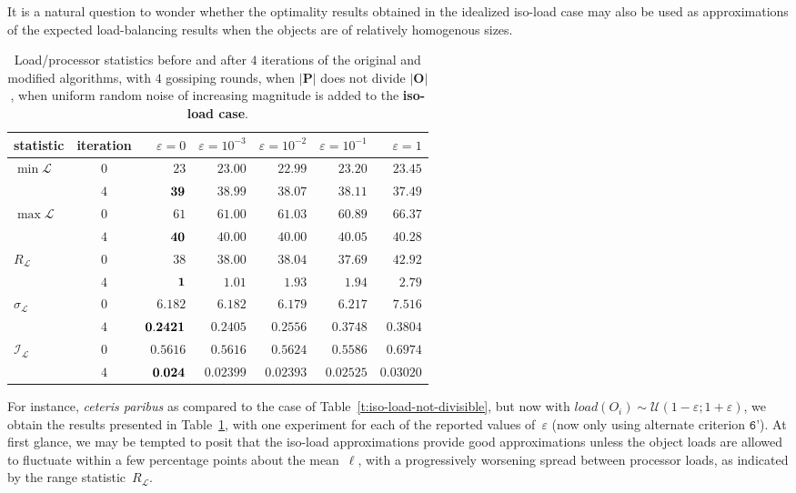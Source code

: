 It is a natural question to wonder whether the optimality results
obtained in the idealized iso-load case may also be used as
approximations of the expected load-balancing results when the objects
are of relatively homogenous sizes.

\begin{table}[htb!]
\begin{center}
\begin{tabular}{@{}lcrrrrr@{}}
\hline
statistic & iteration
& $\varepsilon=0$
& $\varepsilon=10^{-3}$
& $\varepsilon=10^{-2}$
& $\varepsilon=10^{-1}$
& $\varepsilon=1$ \\
\hline\hline
\multirow{2}{*}{$\min{\mathcal{L}}$}
&$0$ &$23$    &$23.00$ &$22.99$ &$23.20$ &$23.45$ \\
&$4$ &$\bf39$ &$38.99$ &$38.07$ &$38.11$ &$37.49$ \\\hline
\multirow{2}{*}{$\max{\mathcal{L}}$}
&$0$ &$61$    &$61.00$ &$61.03$ &$60.89$ &$66.37$ \\
&$4$ &$\bf40$ &$40.00$ &$40.00$ &$40.05$ &$40.28$ \\\hline
\multirow{2}{*}{$R_{\mathcal{L}}$}
&$0$ &$38$    &$38.00$ &$38.04$ &$37.69$ &$42.92$ \\
&$4$ &$\bf1$  &$1.01$  &$1.93$  &$1.94$  &$2.79$  \\\hline
\multirow{2}{*}{$\sigma_{\mathcal{L}}$}
&$0$ &$6.182$     &$6.182$  &$6.179$  &$6.217$ &$7.516$ \\
&$4$ &$\bf0.2421$ &$0.2405$ &$0.2556$ &$0.3748$ &$0.3804$ \\\hline
\multirow{2}{*}{$\mathcal{I}_\mathcal{L}$}
&$0$ &$0.5616$   &$0.5616$  &$0.5624$  &$0.5586$ &$0.6974$ \\
&$4$ &$\bf0.024$ &$0.02399$ &$0.02393$ &$0.02525$ &$0.03020$ \\\hline
\end{tabular}
\end{center}
\caption{\label{t:iso-load-not-divisible-epsilon-i4}
Load/processor statistics before and after $4$ iterations of the
original and modified algorithms, with $4$ gossiping rounds, when
$\vert\mathbf{P}\vert$ does not divide $\vert\mathbf{O}\vert$, when
uniform random noise of increasing magnitude is added to the
\textbf{iso-load case}.}
\end{table}
For instance, \emph{ceteris paribus} as compared to the case
of Table~\ref{t:iso-load-not-divisible}, but now with
$load(O_i)\sim\mathcal{U}(1-\varepsilon;1+\varepsilon)$, we obtain the
results presented in Table~\ref{t:iso-load-not-divisible-epsilon-i4},
with one experiment for each of the reported values of~$\varepsilon$
(now only using alternate criterion $\texttt{6'}$).
At first glance, we may be tempted to posit that the iso-load
approximations provide good approximations unless the object loads are
allowed to fluctuate within a few percentage points about the
mean~$\ell$, with a progressively worsening spread between processor
loads, as indicated by the range statistic~$R_{\mathcal{L}}$.

